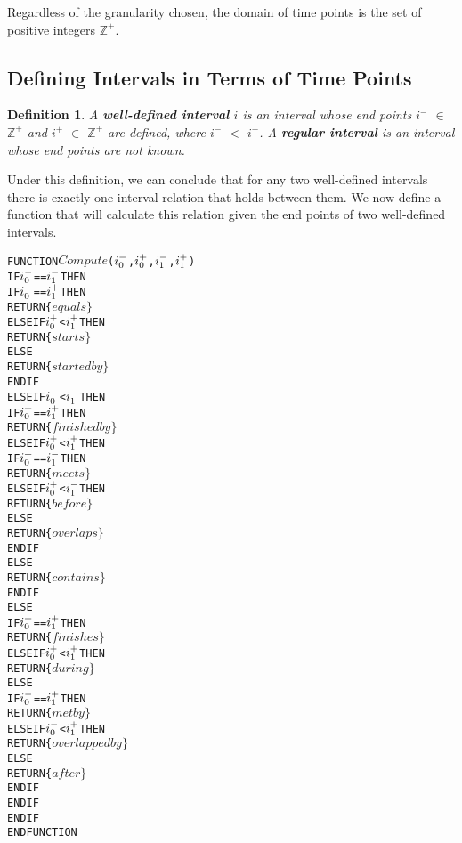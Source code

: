 \documentclass[11pt]{report}
\newtheorem{vdefinition}{Definition}[chapter]
\newenvironment{vverbatim}
{
  \begin{alltt}
}
{
  \vspace{-\baselineskip}
  \end{alltt}
}
\begin{document}
        Regardless of the granularity chosen, the domain of time points is the set of
        positive integers ${\mathbb Z}^{+}$.

      \subsection{Defining Intervals in Terms of Time Points}

        \begin{vdefinition}
          \label{def-interval}
          A {\bf well-defined interval} $i$ is an interval whose end points $i^{-}$
          $\in$ ${\mathbb Z}^{+}$ and $i^{+}$ $\in$ ${\mathbb Z}^{+}$ are defined,
          where $i^{-}$ $<$ $i^{+}$. A {\bf regular interval} is an interval whose
          end points are not known.
        \end{vdefinition}

        Under this definition, we can conclude that for any two well-defined
        intervals there is exactly one interval relation that holds between
        them. We now define a function that will calculate this relation given
        the end points of two well-defined intervals.

        \begin{vverbatim}
  FUNCTION \(Compute\)(\(i\sb{0}\sp{-}\), \(i\sb{0}\sp{+}\), \(i\sb{1}\sp{-}\), \(i\sb{1}\sp{+}\))
    IF \(i\sb{0}\sp{-}\) == \(i\sb{1}\sp{-}\) THEN
      IF \(i\sb{0}\sp{+}\) == \(i\sb{1}\sp{+}\) THEN
        RETURN \{\(equals\}\)
      ELSE IF \(i\sb{0}\sp{+}\) < \(i\sb{1}\sp{+}\) THEN
        RETURN \{\(starts\}\)
      ELSE
        RETURN \{\(started by\}\)
      ENDIF
    ELSE IF \(i\sb{0}\sp{-}\) < \(i\sb{1}\sp{-}\) THEN
      IF \(i\sb{0}\sp{+}\) == \(i\sb{1}\sp{+}\) THEN
        RETURN \{\(finished by\}\)
      ELSE IF \(i\sb{0}\sp{+}\) < \(i\sb{1}\sp{+}\) THEN
        IF \(i\sb{0}\sp{+}\) == \(i\sb{1}\sp{-}\) THEN
          RETURN \{\(meets\}\)
        ELSE IF \(i\sb{0}\sp{+}\) < \(i\sb{1}\sp{-}\) THEN
          RETURN \{\(before\}\)
        ELSE
          RETURN \{\(overlaps\}\)
        ENDIF
      ELSE
        RETURN \{\(contains\}\)
      ENDIF
    ELSE
      IF \(i\sb{0}\sp{+}\) == \(i\sb{1}\sp{+}\) THEN
        RETURN \{\(finishes\}\)
      ELSE IF \(i\sb{0}\sp{+}\) < \(i\sb{1}\sp{+}\) THEN
        RETURN \{\(during\}\)
      ELSE
        IF \(i\sb{0}\sp{-}\) == \(i\sb{1}\sp{+}\) THEN
          RETURN \{\(met by\}\)
        ELSE IF \(i\sb{0}\sp{-}\) < \(i\sb{1}\sp{+}\) THEN
          RETURN \{\(overlapped by\}\)
        ELSE
          RETURN \{\(after\}\)
        ENDIF
      ENDIF
    ENDIF
  ENDFUNCTION
        \end{vverbatim}
\end{document}
